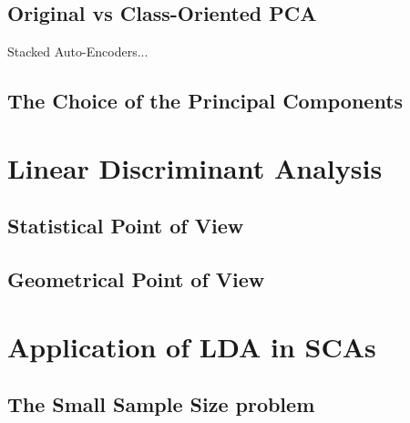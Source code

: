 \subsection{Original vs Class-Oriented PCA}
\begin{remark}
Stacked Auto-Encoders...
\end{remark}
\subsection{The Choice of the Principal Components}


\section{Linear Discriminant Analysis}
\subsection{Statistical Point of View}
\subsection{Geometrical Point of View}


\section{Application of LDA in SCAs}
\subsection{The Small Sample Size problem}